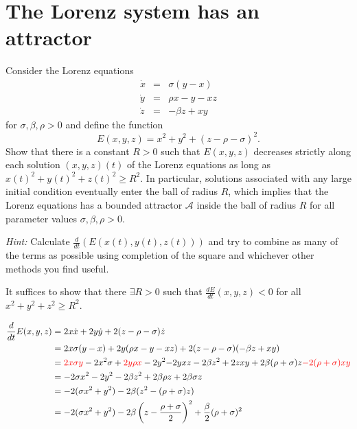 \documentclass[12pt]{article}
\begin{document}
\pagebreak


\section{The Lorenz system has an attractor}

Consider the Lorenz equations
\begin{eqnarray*}
    \dot{x} & = & \sigma (y-x) \\
    \dot{y} & = & \rho x - y - xz \\
    \dot{z} & = & - \beta z + xy
\end{eqnarray*}
for $\sigma,\beta,\rho>0$ and define the function
\[
    E(x,y,z) = x^2+y^2+(z-\rho-\sigma)^2.
\]
Show that there is a constant $R>0$ such that $E(x,y,z)$ decreases strictly along each solution $(x,y,z)(t)$ of the Lorenz equations as long as $x(t)^2+y(t)^2+z(t)^2\geq R^2$. In particular, solutions associated with any large initial condition eventually enter the ball of radius $R$, which implies that the Lorenz equations has a bounded attractor $\mathcal{A}$ inside the ball of radius $R$ for all parameter values $\sigma,\beta,\rho>0$.

\textit{Hint:} Calculate $\frac{d}{d t}(E(x(t),y(t),z(t)))$ and try to combine as many of the terms as possible using completion of the square and whichever other methods you find useful.

\color{blue}
It suffices to show that there $\exists R > 0$ such that $\frac{dE}{dt}(x, y, z) < 0$ for all $x^2 + y^2 + z^2 \geq R^2$.

\begin{align*}
    \frac{d}{dt} E(x, y, z) & = 2x \dot x + 2y \dot y  + 2(z-\rho-\sigma) \dot z                                                                                                                                                             \\
                            & = 2x \sigma (y-x) + 2y (\rho x - y - xz) + 2(z-\rho-\sigma)(-\beta z + xy)                                                                                                                                     \\
                            & = \textcolor{red}{2x \sigma y} - 2x^2 \sigma +\textcolor{red}{2y \rho x} - 2y^2 \textcolor{black}{- 2yxz} - 2\beta z^2 + \textcolor{black}{2zxy} +2\beta (\rho +\sigma)z \textcolor{red}{- 2(\rho + \sigma)xy} \\
                            & = - 2\sigma x^2 -2y^2 -2\beta z^2 + 2\beta \rho z + 2\beta\sigma z                                                                                                                                             \\
                            & = -2(\sigma x^2 + y^2) -2\beta (z^2 - (\rho+\sigma) z )                                                                                                                                                        \\
                            & = -2(\sigma x^2 + y^2) -2\beta \left(z - \frac{\rho +\sigma}{2}\right)^2 + \frac{\beta}{2}(\rho + \sigma)^2
\end{align*}
\end{document}

